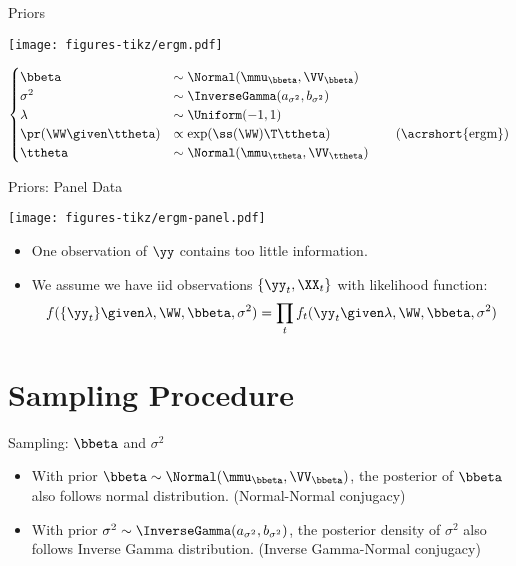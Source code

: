 \documentclass{beamer}
\begin{document}
\begin{frame}{Priors}
	\begin{center}
		\texttt{[image: figures-tikz/ergm.pdf]}
	\end{center}
	\begin{block}{}
		\vspace{-1em}
		\begin{align*}
			\begin{cases}
				\bbeta                & \sim \Normal(\mmu_{\bbeta},\VV_{\bbeta}) \\
				\sigma^2              & \sim \InverseGamma(a_{\sigma^2},b_{\sigma^2}) \\
				\lambda               & \sim \Uniform(-1,1) \\
				\pr(\WW\given\ttheta) & \propto \exp(\ss(\WW)\T\ttheta) \hspace{5em}\text{(\acrshort{ergm})} \\
				\ttheta               & \sim \Normal(\mmu_{\ttheta},\VV_{\ttheta})
			\end{cases}
		\end{align*}
	\end{block}
\end{frame}

\begin{frame}{Priors: Panel Data}
	\begin{center}
		\texttt{[image: figures-tikz/ergm-panel.pdf]}
	\end{center}
	\begin{itemize}
		\item
			One observation of $\yy$ contains too little information.
		\item
			We assume we have iid observations $\{\yy_{t},\XX_{t}\}$ with likelihood function:
			\begin{align*}
				f(\{\yy_{t}\}\given\lambda,\WW,\bbeta,\sigma^2)
				= \prod_{t} f_t(\yy_{t}\given\lambda,\WW,\bbeta,\sigma^2)
			\end{align*}
	\end{itemize}
\end{frame}

\section{Sampling Procedure}

\begin{frame}{Sampling: $\bbeta$ and $\sigma^2$}
	\begin{itemize}
		\item
			With prior $\bbeta\sim\Normal(\mmu_{\bbeta},\VV_{\bbeta})$,
			the posterior of $\bbeta$ also follows normal distribution.
			(Normal-Normal conjugacy)
		\item
			With prior $\sigma^{2}\sim\InverseGamma(a_{\sigma^2},b_{\sigma^2})$,
			the posterior density of $\sigma^2$ also follows Inverse Gamma distribution.
			(Inverse Gamma-Normal conjugacy)
	\end{itemize}
\end{frame}
\end{document}
